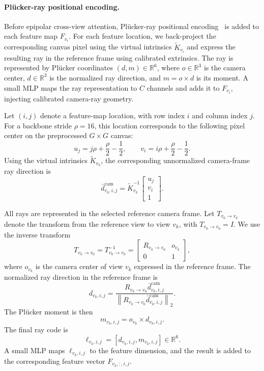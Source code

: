 \paragraph{Pl\"ucker-ray positional encoding.}
Before epipolar cross-view attention, Pl\"ucker-ray positional encoding~\cite{sitzmann2021lightfield,kant2024spad} is added to each feature map \(F_{v_i}\).
For each feature location, we back-project the corresponding canvas pixel using the virtual intrinsics \(\tilde K_{v_i}\) and express the resulting ray in the reference frame using calibrated extrinsics.
The ray is represented by Pl\"ucker coordinates \((d,m)\in\mathbb{R}^6\), where \(o\in\mathbb{R}^3\) is the camera center, \(d\in\mathbb{R}^3\) is the normalized ray direction, and \(m=o\times d\) is its moment.
A small MLP maps the ray representation to \(C\) channels and adds it to \(F_{v_i}\), injecting calibrated camera-ray geometry.



\label{supp:plucker}

Let \((i,j)\) denote a feature-map location, with row index \(i\) and
column index \(j\). For a backbone stride \(\rho=16\), this location
corresponds to the following pixel center on the preprocessed
\(G \times G\) canvas:
\[
u_j = j\rho + \frac{\rho}{2} - \frac{1}{2},
\qquad
v_i = i\rho + \frac{\rho}{2} - \frac{1}{2}.
\]
Using the virtual intrinsics \(\tilde{K}_{v_k}\), the corresponding
unnormalized camera-frame ray direction is
\[
\bar{d}^{\mathrm{cam}}_{v_k,i,j}
=
\tilde{K}_{v_k}^{-1}
\begin{bmatrix}
u_j \\ v_i \\ 1
\end{bmatrix}.
\]

All rays are represented in the selected reference camera frame. Let
\(T_{v_0 \rightarrow v_k}\) denote the transform from the reference view
to view \(v_k\), with \(T_{v_0 \rightarrow v_0}=I\). We use the inverse
transform
\[
T_{v_k \rightarrow v_0}
=
T_{v_0 \rightarrow v_k}^{-1}
=
\begin{bmatrix}
R_{v_k \rightarrow v_0} & o_{v_k} \\
0 & 1
\end{bmatrix},
\]
where \(o_{v_k}\) is the camera center of view \(v_k\) expressed in the
reference frame. The normalized ray direction in the reference frame is
\[
d_{v_k,i,j}
=
\frac{
R_{v_k \rightarrow v_0}
\bar{d}^{\mathrm{cam}}_{v_k,i,j}
}{
\left\|
R_{v_k \rightarrow v_0}
\bar{d}^{\mathrm{cam}}_{v_k,i,j}
\right\|_2
}.
\]
The Pl\"ucker moment is then
\[
m_{v_k,i,j} = o_{v_k} \times d_{v_k,i,j}.
\]
The final ray code is
\[
\ell_{v_k,i,j}
=
\left[
d_{v_k,i,j},
m_{v_k,i,j}
\right]
\in \mathbb{R}^{6}.
\]
A small MLP maps \(\ell_{v_k,i,j}\) to the feature dimension, and the
result is added to the corresponding feature vector \(F_{v_k,:,i,j}\).

